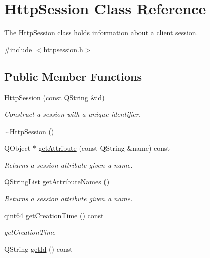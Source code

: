 \hypertarget{class_http_session}{}\section{Http\+Session Class Reference}
\label{class_http_session}


The \hyperlink{class_http_session}{Http\+Session} class holds information about a client session.  




{\ttfamily \#include $<$httpsession.\+h$>$}

\subsection*{Public Member Functions}
\begin{DoxyCompactItemize}
\item 
\hyperlink{class_http_session_adbc731f974a6de5996b7878303f351af}{Http\+Session} (const Q\+String \&id)
\begin{DoxyCompactList}\small\item\em Construct a session with a unique identifier. \end{DoxyCompactList}\item 
\hyperlink{class_http_session_afb9e986ea06dc1cb767d3d6fbf6f420c}{$\sim$\+Http\+Session} ()
\item 
Q\+Object $\ast$ \hyperlink{class_http_session_acef8380ce20f3adb9d2bb9aad0ff3f46}{get\+Attribute} (const Q\+String \&name) const
\begin{DoxyCompactList}\small\item\em Returns a session attribute given a name. \end{DoxyCompactList}\item 
Q\+String\+List \hyperlink{class_http_session_aca7b24bde0466a8140c30f6642c8dfc4}{get\+Attribute\+Names} ()
\begin{DoxyCompactList}\small\item\em Returns a session attribute given a name. \end{DoxyCompactList}\item 
qint64 \hyperlink{class_http_session_a2904b92fb73b8cead32068611878a9eb}{get\+Creation\+Time} () const
\begin{DoxyCompactList}\small\item\em get\+Creation\+Time \end{DoxyCompactList}\item 
Q\+String \hyperlink{class_http_session_a358bfe548463d39bbdc167bd8c630edc}{get\+Id} () const

\end{DoxyCompactItemize}
